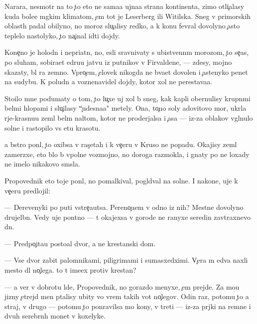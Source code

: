 \documentclass[10pt]{book}
\begin{document}
Narara, nesmotr{\ia} na to {\c}to eto ne sama{\y}a {\y}ujna{\y}a strana kontinenta, zimo{\y} otli{\c}alasy kuda bole{\y}e m{\ia}gkim klimatom, {\c}em tot je Leserberg ili Witilska. Sneg v primorskih oblast{\ia}h padal obilyno, no moroz{\yi} slu{\c}alisy redko, a k kon{\q}u fevral{\ia} dovolyno {\c}asto teplelo nastolyko, {\c}to na{\c}inal idti dojdy.

Kone{\c}no je holodn{\yi}{\y} i nepri{\y}atn{\yi}{\y}, no, {\y}esli sravnivaty s ubi{\y}stvenn{\yi}m morozom, {\c}to se{\y}{\c}as, po sluham, sobira{\y}et {\x}edru{\y}u jatvu iz putnikov v Firvaldene, — zdesy, mojno skazaty, b{\yi}l ra{\y} zemno{\y}. Vpro{\c}em, {\c}elovek nikogda ne b{\yi}va{\y}et dovolen i {\c}astenyko pen{\ia}{\y}et na sudybu. K poludn{\iu} {\y}a voznenavidel dojdy, kotor{\yi}{\y} xol ne perestava{\y}a.

Sto{\y}ilo mne podumaty o tom, {\c}to lu{\c}xe uj xol b{\yi} sneg, kak kapli obernulisy krupn{\yi}mi bel{\yi}mi hlop{\y}ami i slu{\c}ilasy ``{\c}udesna{\y}a" metely. Ona, to{\c}no soly {\Y}adovitovo mor{\ia}, ukr{\yi}la r{\yi}je-krasnu{\y}u zeml{\iu} bel{\yi}m nal{\e}tom, kotor{\yi}{\y} ne proderjalsa i {\c}asa — iz-za oblakov v{\yi}gl{\ia}nulo soln{\q}e i rastopilo vs{\iu} etu krasotu.

{\Y}a b{\yi}stro pon{\ia}l, {\c}to oxibsa v ras{\c}etah i k ve{\c}eru v Kruso ne popadu. Okajisy zeml{\ia} zamerzxe{\y}, eto b{\yi}lo b{\yi} vpolne vozmojno, no doroga razmokla, i gnaty po ne{\y} loxady ne imelo nikakovo sm{\yi}sla.

Propovednik eto toje pon{\ia}l, no pomalkival, pogl{\ia}d{\yi}val na soln{\q}e. I nakone{\q}, uje k ve{\c}eru predlojil:

— Derevenyki po puti vstre{\c}a{\y}utsa. Pereno{\c}u{\y}em v odno{\y} iz nih? Mestn{\yi}{\y}e dovolyno drujel{\iu}bn{\yi}. Vedy uje pon{\ia}tno — t{\yi} okajexsa v gorode ne ranyxe seredin{\yi} zavtraxnevo dn{\ia}.

— Predpo{\c}ita{\y}u posto{\y}al{\yi}{\y} dvor, a ne krest{\y}anski{\y} dom.

— Vse dvor{\yi} zabit{\yi} palomnikami, piligrimami i sumasxedximi. V{\c}era m{\yi} {\y}edva naxli mesto dl{\ia} no{\c}lega. {\C}to t{\yi} ime{\y}ex protiv krest{\y}an?

— {\Y}a ver{\iu} v dobrotu l{\iu}de{\y}, Propovednik, no gorazdo menyxe, {\c}em prejde. Za mo{\y}u jizny {\c}et{\yi}rejd{\yi} men{\ia} p{\yi}talisy ubity vo vrem{\ia} takih vot no{\c}legov. Odin raz, potomu {\c}to {\y}a straj, v drugo{\y} — potomu {\c}to ponravilsa mo{\y} kony, v treti{\y} — iz-za pr{\ia}jki na remne i dvuh serebr{\ia}n{\yi}h monet v koxelyke.
\end{document}
